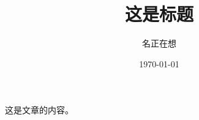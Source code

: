 \documentclass[UTF8]{ctexart}
\title{这是标题}
\author{名正在想}
\date{\today}
\begin{document}
\maketitle
这是文章的内容。
\end{document}
